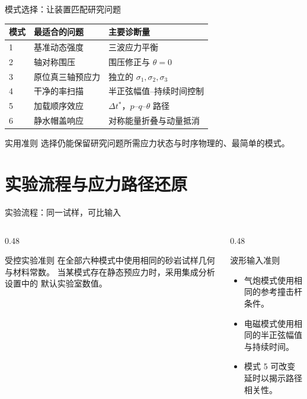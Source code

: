\documentclass[11pt,aspectratio=169]{beamer}
\newcommand{\toprule}{\hline}
\newcommand{\midrule}{\hline}
\newcommand{\bottomrule}{\hline}
\begin{document}
\begin{frame}{模式选择：让装置匹配研究问题}
  \small
  \begin{tabular}{@{}p{}p{}p{}@{}}
    \toprule
    \textbf{模式} & \textbf{最适合的问题} & \textbf{主要诊断量} \\
    \midrule
    1 & 基准动态强度 & 三波应力平衡 \\
    2 & 轴对称围压 & 围压修正与 $\theta=0$ \\
    3 & 原位真三轴预应力 & 独立的 $\sigma_1,\sigma_2,\sigma_3$ \\
    4 & 干净的率扫描 & 半正弦幅值--持续时间控制 \\
    5 & 加载顺序效应 & $\Delta t^\ast$，$p$--$q$--$\theta$ 路径 \\
    6 & 静水帽盖响应 & 对称能量折叠与动量抵消 \\
    \bottomrule
  \end{tabular}
  \vspace{0.35cm}
  \begin{block}{实用准则}
    选择仍能保留研究问题所需应力状态与时序物理的、最简单的模式。
  \end{block}
\end{frame}

\section{实验流程与应力路径还原}

\begin{frame}{实验流程：同一试样，可比输入}
  \begin{columns}[T,onlytextwidth]
    \begin{column}{0.48\textwidth}
      \begin{block}{受控实验准则}
        在全部六种模式中使用相同的砂岩试样几何与材料常数。
        当某模式存在静态预应力时，采用集成分析设置中的
        默认实验室数值。
      \end{block}
    \end{column}
    \begin{column}{0.48\textwidth}
      \begin{exampleblock}{波形输入准则}
        \begin{itemize}
          \item 气炮模式使用相同的参考撞击杆条件。
          \item 电磁模式使用相同的半正弦幅值与持续时间。
          \item 模式 5 可改变延时以揭示路径相关性。
        \end{itemize}
      \end{exampleblock}
    \end{column}
  \end{columns}
\end{frame}
\end{document}
